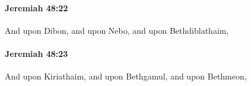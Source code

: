 		\paragraph{Jeremiah 48:22} %
			\label{JEREMIAH-48-22}

			And upon Dibon, and upon Nebo, and upon Bethdiblathaim,


		\paragraph{Jeremiah 48:23} %
			\label{JEREMIAH-48-23}

			And upon Kiriathaim, and upon Bethgamul, and upon Bethmeon,


